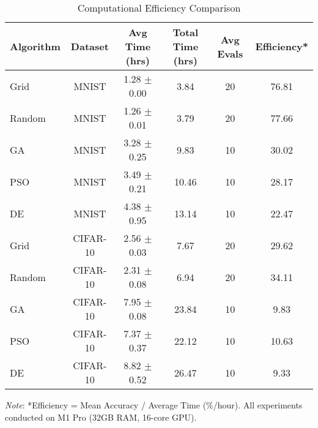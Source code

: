 \begin{table}[htbp]
\centering
\caption{Computational Efficiency Comparison}
\label{tab:computational_efficiency}
\begin{tabular}{lccccc}
\toprule
\textbf{Algorithm} & \textbf{Dataset} & \textbf{Avg Time (hrs)} & \textbf{Total Time (hrs)} & \textbf{Avg Evals} & \textbf{Efficiency*} \\
\midrule
Grid & MNIST & 1.28 $\pm$ 0.00 & 3.84 & 20 & 76.81 \\
Random & MNIST & 1.26 $\pm$ 0.01 & 3.79 & 20 & 77.66 \\
GA & MNIST & 3.28 $\pm$ 0.25 & 9.83 & 10 & 30.02 \\
PSO & MNIST & 3.49 $\pm$ 0.21 & 10.46 & 10 & 28.17 \\
DE & MNIST & 4.38 $\pm$ 0.95 & 13.14 & 10 & 22.47 \\
\midrule
Grid & CIFAR-10 & 2.56 $\pm$ 0.03 & 7.67 & 20 & 29.62 \\
Random & CIFAR-10 & 2.31 $\pm$ 0.08 & 6.94 & 20 & 34.11 \\
GA & CIFAR-10 & 7.95 $\pm$ 0.08 & 23.84 & 10 & 9.83 \\
PSO & CIFAR-10 & 7.37 $\pm$ 0.37 & 22.12 & 10 & 10.63 \\
DE & CIFAR-10 & 8.82 $\pm$ 0.52 & 26.47 & 10 & 9.33 \\
\bottomrule
\end{tabular}
\vspace{2mm}
\begin{minipage}{\textwidth}
\small
\textit{Note}: *Efficiency = Mean Accuracy / Average Time (\%/hour). All experiments conducted on M1 Pro (32GB RAM, 16-core GPU).
\end{minipage}
\end{table}
